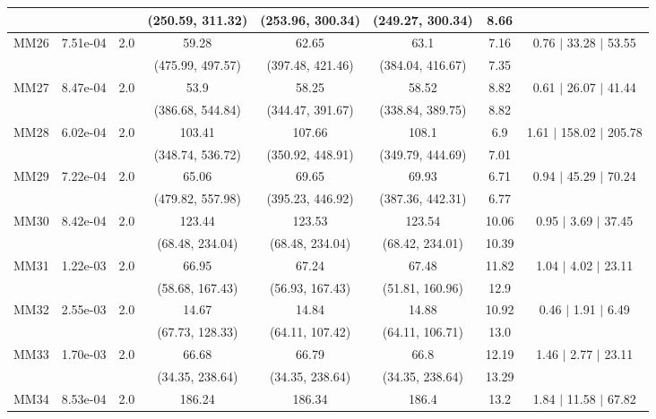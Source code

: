 \begin{longtable}{|c|c|c|c|c|c|c|c|}
	 &  &  & (250.59, 311.32) & (253.96, 300.34) & (249.27, 300.34) & 8.66 & \\
 	\hline
	\multirow{2}{*}{MM26} & \multirow{2}{*}{7.51e-04} & \multirow{2}{*}{2.0} & 59.28 & 62.65 & 63.1 & 7.16 & 0.76 $\mid$ 33.28 $\mid$ 53.55\\
	 &  &  & (475.99, 497.57) & (397.48, 421.46) & (384.04, 416.67) & 7.35 & \\
 	\hline
	\multirow{2}{*}{MM27} & \multirow{2}{*}{8.47e-04} & \multirow{2}{*}{2.0} & 53.9 & 58.25 & 58.52 & 8.82 & 0.61 $\mid$ 26.07 $\mid$ 41.44\\
	 &  &  & (386.68, 544.84) & (344.47, 391.67) & (338.84, 389.75) & 8.82 & \\
 	\hline
	\multirow{2}{*}{MM28} & \multirow{2}{*}{6.02e-04} & \multirow{2}{*}{2.0} & 103.41 & 107.66 & 108.1 & 6.9 & 1.61 $\mid$ 158.02 $\mid$ 205.78\\
	 &  &  & (348.74, 536.72) & (350.92, 448.91) & (349.79, 444.69) & 7.01 & \\
 	\hline
	\multirow{2}{*}{MM29} & \multirow{2}{*}{7.22e-04} & \multirow{2}{*}{2.0} & 65.06 & 69.65 & 69.93 & 6.71 & 0.94 $\mid$ 45.29 $\mid$ 70.24\\
	 &  &  & (479.82, 557.98) & (395.23, 446.92) & (387.36, 442.31) & 6.77 & \\
 	\hline
	\multirow{2}{*}{MM30} & \multirow{2}{*}{8.42e-04} & \multirow{2}{*}{2.0} & 123.44 & 123.53 & 123.54 & 10.06 & 0.95 $\mid$ 3.69 $\mid$ 37.45\\
	 &  &  & (68.48, 234.04) & (68.48, 234.04) & (68.42, 234.01) & 10.39 & \\
 	\hline
	\multirow{2}{*}{MM31} & \multirow{2}{*}{1.22e-03} & \multirow{2}{*}{2.0} & 66.95 & 67.24 & 67.48 & 11.82 & 1.04 $\mid$ 4.02 $\mid$ 23.11\\
	 &  &  & (58.68, 167.43) & (56.93, 167.43) & (51.81, 160.96) & 12.9 & \\
 	\hline
	\multirow{2}{*}{MM32} & \multirow{2}{*}{2.55e-03} & \multirow{2}{*}{2.0} & 14.67 & 14.84 & 14.88 & 10.92 & 0.46 $\mid$ 1.91 $\mid$ 6.49\\
	 &  &  & (67.73, 128.33) & (64.11, 107.42) & (64.11, 106.71) & 13.0 & \\
 	\hline
	\multirow{2}{*}{MM33} & \multirow{2}{*}{1.70e-03} & \multirow{2}{*}{2.0} & 66.68 & 66.79 & 66.8 & 12.19 & 1.46 $\mid$ 2.77 $\mid$ 23.11\\
	 &  &  & (34.35, 238.64) & (34.35, 238.64) & (34.35, 238.64) & 13.29 & \\
 	\hline
	\multirow{2}{*}{MM34} & \multirow{2}{*}{8.53e-04} & \multirow{2}{*}{2.0} & 186.24 & 186.34 & 186.4 & 13.2 & 1.84 $\mid$ 11.58 $\mid$ 67.82\\

\end{longtable}

